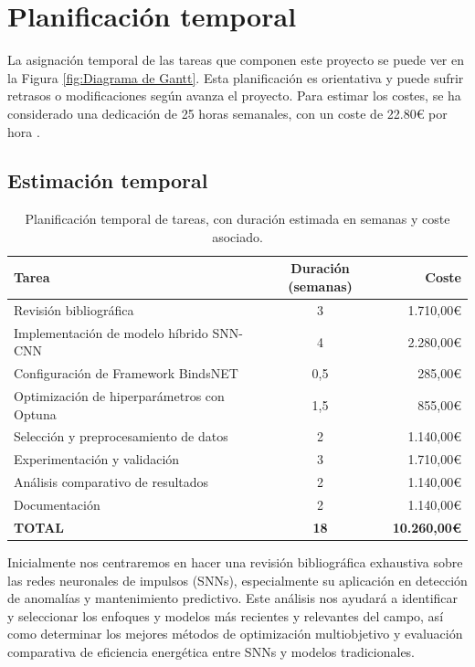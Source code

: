 \section{Planificación temporal}

La asignación temporal de las tareas que componen este proyecto se puede ver en la Figura \ref{fig:Diagrama de Gantt}. Esta planificación es orientativa y puede sufrir retrasos o modificaciones según avanza el proyecto. Para estimar los costes, se ha considerado una dedicación de 25 horas semanales, con un coste de 22.80€ por hora \cite{Talent.com_2024}.

\subsection{Estimación temporal}

\begin{table}[htbp]
\centering
\begin{tabular}{lcr}
\hline \hline
\textbf{Tarea} & \textbf{Duración (semanas)} & \textbf{Coste} \\
\hline
Revisión bibliográfica & 3 & 1.710,00€ \\
Implementación de modelo híbrido SNN-CNN & 4 & 2.280,00€ \\
Configuración de Framework BindsNET & 0,5 & 285,00€ \\
Optimización de hiperparámetros con Optuna & 1,5 & 855,00€ \\
Selección y preprocesamiento de datos & 2 & 1.140,00€ \\
Experimentación y validación & 3 & 1.710,00€ \\
Análisis comparativo de resultados & 2 & 1.140,00€ \\
Documentación  & 2 & 1.140,00€ \\
\hline
\textbf{TOTAL} & \textbf{18} & \textbf{10.260,00€} \\
\hline \hline
\end{tabular}
\caption{Planificación temporal de tareas, con duración estimada en semanas y coste asociado.}
\label{tab:planificacion_tareas}
\end{table}

Inicialmente nos centraremos en hacer una revisión bibliográfica exhaustiva sobre las redes neuronales de impulsos (SNNs), especialmente su aplicación en detección de anomalías y mantenimiento predictivo. Este análisis nos ayudará a identificar y seleccionar los enfoques y modelos más recientes y relevantes del campo, así como determinar los mejores métodos de optimización multiobjetivo y evaluación comparativa de eficiencia energética entre SNNs y modelos tradicionales.

